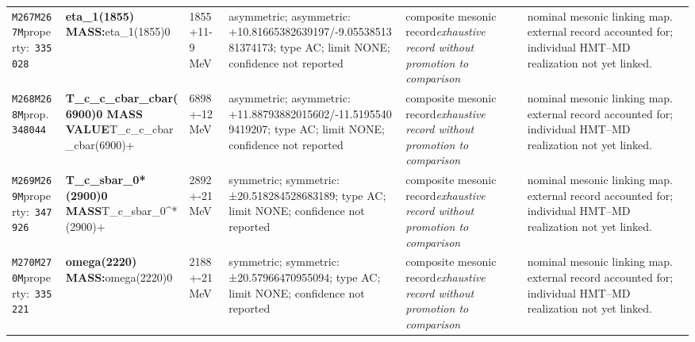\begin{landscape}
\begin{longtable}{L{1.85cm}L{4.45cm}L{2.35cm}L{4.05cm}L{3.35cm}L{7.15cm}}
\texttt{M267}\newline \texttt{M267M}\newline property:\ \texttt{335028} & \textbf{eta\_\allowbreak{}1(1855) MASS:}\newline eta\_\allowbreak{}1(1855)0 & 1855+11-9\,MeV & asymmetric; asymmetric: +10.81665382639197/-9.0553851381374173; type AC; limit NONE; confidence not reported & composite mesonic record\newline \emph{exhaustive record without promotion to comparison} & nominal mesonic linking map. external record accounted for; individual HMT--MD realization not yet linked. \\
\texttt{M268}\newline \texttt{M268M}\newline prop.\ \texttt{348044} & \textbf{T\_\allowbreak{}c\_\allowbreak{}c\_\allowbreak{}cbar\_\allowbreak{}cbar(6900)0 MASS VALUE}\newline T\_\allowbreak{}c\_\allowbreak{}c\_\allowbreak{}cbar\_\allowbreak{}cbar(6900)+ & 6898+-12\,MeV & asymmetric; asymmetric: +11.88793882015602/-11.51955409419207; type AC; limit NONE; confidence not reported & composite mesonic record\newline \emph{exhaustive record without promotion to comparison} & nominal mesonic linking map. external record accounted for; individual HMT--MD realization not yet linked. \\
\texttt{M269}\newline \texttt{M269M}\newline property:\ \texttt{347926} & \textbf{T\_\allowbreak{}c\_\allowbreak{}sbar\_\allowbreak{}0*(2900)0 MASS}\newline T\_\allowbreak{}c\_\allowbreak{}sbar\_\allowbreak{}0\textasciicircum{}*(2900)+ & 2892+-21\,MeV & symmetric; symmetric: ±20.518284528683189; type AC; limit NONE; confidence not reported & composite mesonic record\newline \emph{exhaustive record without promotion to comparison} & nominal mesonic linking map. external record accounted for; individual HMT--MD realization not yet linked. \\
\texttt{M270}\newline \texttt{M270M}\newline property:\ \texttt{335221} & \textbf{omega(2220) MASS:}\newline omega(2220)0 & 2188+-21\,MeV & symmetric; symmetric: ±20.57966470955094; type AC; limit NONE; confidence not reported & composite mesonic record\newline \emph{exhaustive record without promotion to comparison} & nominal mesonic linking map. external record accounted for; individual HMT--MD realization not yet linked. \\

\end{longtable}
\end{landscape}
